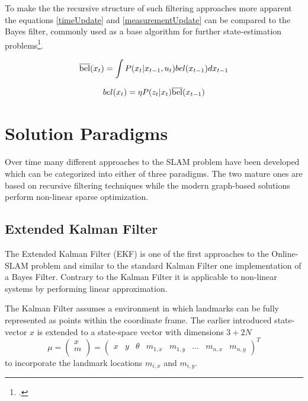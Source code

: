 To make the the recursive structure of such filtering approaches more apparent the equations \ref{timeUpdate} and \ref{measurementUpdate} can be compared to the Bayes filter, commonly used as a base algorithm for further state-estimation problems\footcite[Page 23]{thrun2002probabilisticRobotics}.

\begin{equation}\label{timeUpdateBayes}
	\overline{\rm bel}(x_{t}) = \int P(x_{t} | x_{t-1}, u_{t})  bel(x_{t-1}) dx_{t-1}
\end{equation}


\begin{equation}\label{measurementUpdateBayes}
	bel(x_{t}) = \eta  P(z_{t} | x_{t})  \overline{\rm bel}(x_{t-1})
\end{equation}

\section{Solution Paradigms} 
Over time many different approaches to the SLAM problem have been developed which can be categorized into either of three paradigms. The two mature ones are based on recursive filtering techniques while the modern graph-based solutions perform non-linear sparse optimization.

\subsection{Extended Kalman Filter}
The Extended Kalman Filter (EKF) is one of the first approaches to the Online-SLAM problem and similar to the standard Kalman Filter one implementation of a Bayes Filter. Contrary to the Kalman Filter it is applicable to non-linear systems by performing linear approximation.


The Kalman Filter assumes a environment in which landmarks can be fully represented as points within the coordinate frame. The earlier introduced state-vector $ x $ is extended to a state-space vector with dimensions $ 3 + 2N$
\[ \mu = 
\begin{pmatrix}
	x \\
	m \\
\end{pmatrix}
=
\begin{pmatrix}
	x & y & \theta & m_{1, x} & m_{1, y} & \dots & m_{n, x} & m_{n, y} 
\end{pmatrix} ^{T}
\] 
to incorporate the landmark locations $ m_{i, x} $ and $ m_{i, y} $. 

